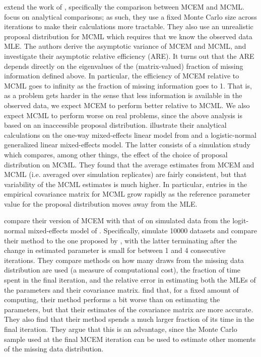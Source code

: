 \documentclass[11pt, oneside]{article}   	%
\begin{document}
\citet{Jan03} extend the work of \citet{Boo01}, specifically the comparison between MCEM and MCML. \citeauthor{Jan03} focus on analytical comparisons; as such, they use a fixed Monte Carlo size across iterations to make their calculations more tractable. They also use an unrealistic proposal distribution for MCML which requires that we know the observed data MLE. The authors derive the asymptotic variance of MCEM and MCML, and investigate their asymptotic relative efficiency (ARE). It turns out that the ARE depends directly on the eigenvalues of the (matrix-valued) fraction of missing information defined above. In particular, the efficiency of MCEM relative to MCML goes to infinity as the fraction of missing information goes to 1. That is, as a problem gets harder in the sense that less information is available in the observed data, we expect MCEM to perform better relative to MCML. We also expect MCML to perform worse on real problems, since the above analysis is based on an inaccessible proposal distribution. \citeauthor{Jan03} illustrate their analytical calculations on the one-way mixed-effects linear model from \citet{Boo01} and a logistic-normal generalized linear mixed-effects model. The latter consists of a simulation study which compares, among other things, the effect of the choice of proposal distribution on MCML. They found that the average estimates from MCEM and MCML (i.e. averaged over simulation replicates) are fairly consistent, but that variability of the MCML estimates is much higher. In particular, entries in the empirical covariance matrix for MCML grow rapidly as the reference parameter value for the proposal distribution moves away from the MLE.

\citet{Caf05} compare their version of MCEM with that of \citet{Boo99} on simulated data from the logit-normal mixed-effects model of \citet{McC97}. Specifically, \citeauthor{Caf05} simulate 10000 datasets and compare their method to the one proposed by \citet{Boo99}, with the latter terminating after the change in estimated parameter is small for between 1 and 4 consecutive iterations. They compare methods on how many draws from the missing data distribution are used (a measure of computational cost), the fraction of time spent in the final iteration, and the relative error in estimating both the MLEs of the parameters and their covariance matrix. \citeauthor{Caf05} find that, for a fixed amount of computing, their method performs a bit worse than \citet{Boo99} on estimating the parameters, but that their estimates of the covariance matrix are more accurate. They also find that their method spends a much larger fraction of its time in the final iteration. They argue that this is an advantage, since the Monte Carlo sample used at the final MCEM iteration can be used to estimate other moments of the missing data distribution.
\end{document}
